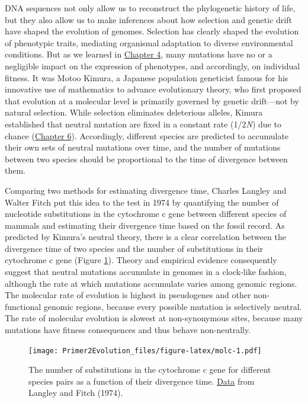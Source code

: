 \documentclass[
]{book}
\begin{document}
DNA sequences not only allow us to reconstruct the phylogenetic history of life, but they also allow us to make inferences about how selection and genetic drift have shaped the evolution of genomes. Selection has clearly shaped the evolution of phenotypic traits, mediating organismal adaptation to diverse environmental conditions. But as we learned in \href{the-raw-materials-for-evolution.html}{Chapter 4}, many mutations have no or a negligible impact on the expression of phenotypes, and accordingly, on individual fitness. It was Motoo Kimura, a Japanese population geneticist famous for his innovative use of mathematics to advance evolutionary theory, who first proposed that evolution at a molecular level is primarily governed by genetic drift---not by natural selection. While selection eliminates deleterious alleles, Kimura established that neutral mutation are fixed in a constant rate (1/2\emph{N}) due to chance (\href{evolutionary-mechanisms-ii-mutation-genetic-drift-migration-and-non-random-mating.html\#genetic-drift-the-random-force}{Chapter 6}). Accordingly, different species are predicted to accumulate their own sets of neutral mutations over time, and the number of mutations between two species should be proportional to the time of divergence between them.

Comparing two methods for estimating divergence time, Charles Langley and Walter Fitch put this idea to the test in 1974 by quantifying the number of nucleotide substitutions in the cytochrome c gene between different species of mammals and estimating their divergence time based on the fossil record. As predicted by Kimura's neutral theory, there is a clear correlation between the divergence time of two species and the number of substitutions in their cytochrome c gene (Figure \ref{fig:molc}). Theory and empirical evidence consequently suggest that neutral mutations accumulate in genomes in a clock-like fashion, although the rate at which mutations accumulate varies among genomic regions. The molecular rate of evolution is highest in pseudogenes and other non-functional genomic regions, because every possible mutation is selectively neutral. The rate of molecular evolution is slowest at non-synonymous sites, because many mutations have fitness consequences and thus behave non-neutrally.

\begin{figure}
\centering
\texttt{[image: Primer2Evolution\_files/figure-latex/molc-1.pdf]}
\caption{\label{fig:molc}The number of substitutions in the cytochrome c gene for different species pairs as a function of their divergence time. \href{data/7_molclock.csv}{Data} from Langley and Fitch (1974).}
\end{figure}
\end{document}
